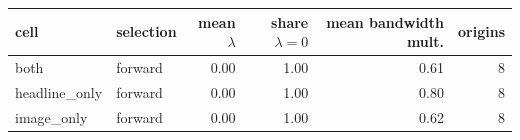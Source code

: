 \begin{tabular}{llrrrr}
\toprule
cell & selection & mean $\lambda$ & share $\lambda=0$ & mean bandwidth mult. & origins \\
\midrule
both & forward & 0.00 & 1.00 & 0.61 & 8 \\
headline\_only & forward & 0.00 & 1.00 & 0.80 & 8 \\
image\_only & forward & 0.00 & 1.00 & 0.62 & 8 \\
\bottomrule
\end{tabular}
